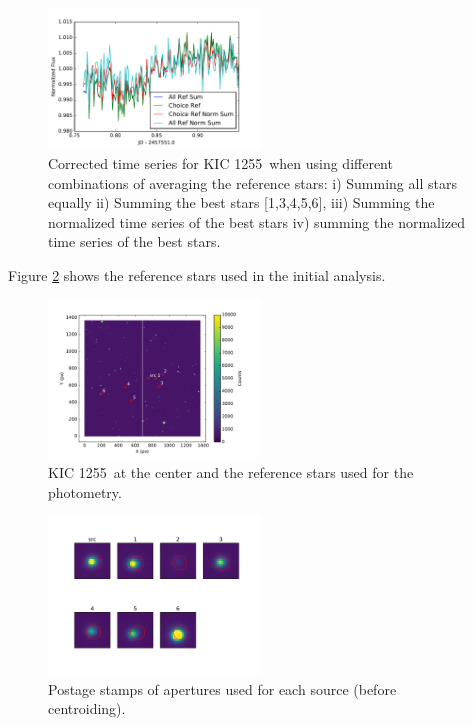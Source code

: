\documentclass[twocolumn]{aastex61}
\newcommand{\shStar}{KIC 1255}
\begin{document}
\begin{figure}
\begin{centering}
\includegraphics[width=0.5\textwidth]{images/reference_method.pdf}
\caption{Corrected time series for \shStar\ when using different combinations of averaging the reference stars: i) Summing all stars equally ii) Summing the best stars [1,3,4,5,6], iii) Summing the normalized time series of the best stars iv) summing the normalized time series of the best stars.}\label{fig:refSumMethods}
\end{centering}
\end{figure}

Figure \ref{fig:starLabels} shows the reference stars used in the initial analysis.

\begin{figure}
\begin{centering}
\includegraphics[width=0.5\textwidth]{images/st_labels.pdf}
\caption{\shStar\ at the center and the reference stars used for the photometry.}\label{fig:starLabels}
\end{centering}
\end{figure}

\begin{figure}
\begin{centering}
\includegraphics[width=0.5\textwidth]{images/postage_stamps.pdf}
\caption{Postage stamps of apertures used for each source (before centroiding).}\label{fig:starPostageGuess}
\end{centering}
\end{figure}
\end{document}
